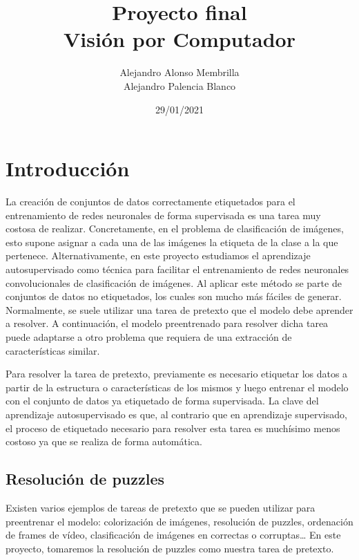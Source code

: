 \documentclass[10pt,a4paper]{article}
\title{
Proyecto final\\
\large Visión por Computador \\
}
\author{
Alejandro Alonso Membrilla\\
Alejandro Palencia Blanco\\
}
\date{29/01/2021}
\begin{document}
\maketitle

\newpage

\tableofcontents

\newpage

\section{Introducción}

La creación de conjuntos de datos correctamente etiquetados para el entrenamiento de redes neuronales de forma supervisada es una tarea muy costosa de realizar. Concretamente, en el problema de clasificación de imágenes, esto supone asignar a cada una de las imágenes la etiqueta de la clase a la que pertenece. Alternativamente, en este proyecto estudiamos el aprendizaje autosupervisado como técnica para facilitar el entrenamiento de redes neuronales convolucionales de clasificación de imágenes. Al aplicar este método se parte de conjuntos de datos no etiquetados, los cuales son mucho más fáciles de generar. Normalmente, se suele utilizar una tarea de pretexto que el modelo debe aprender a resolver. A continuación, el modelo preentrenado para resolver dicha tarea puede adaptarse a otro problema que requiera de una extracción de características similar.

Para resolver la tarea de pretexto, previamente es necesario etiquetar los datos a partir de la estructura o características de los mismos y luego entrenar el modelo con el conjunto de datos ya etiquetado de forma supervisada. La clave del aprendizaje autosupervisado es que, al contrario que en aprendizaje supervisado, el proceso de etiquetado necesario para resolver esta tarea es muchísimo menos costoso ya que se realiza de forma automática. 

\subsection{Resolución de puzzles}

Existen varios ejemplos de tareas de pretexto que se pueden utilizar para preentrenar el modelo: colorización de imágenes, resolución de puzzles, ordenación de frames de vídeo, clasificación de imágenes en correctas o corruptas… En este proyecto, tomaremos la resolución de puzzles como nuestra tarea de pretexto.
\end{document}
